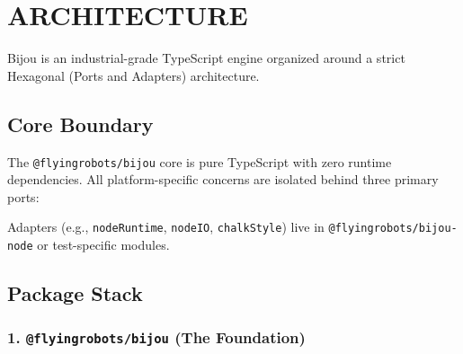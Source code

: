 \chapter{ARCHITECTURE}\label{record-003}

\smallskip

Bijou is an industrial-grade TypeScript engine organized around a strict Hexagonal (Ports and Adapters) architecture.

\section{Core Boundary}\label{record-003-core-boundary}

The \texttt{@\allowbreak{}f\allowbreak{}l\allowbreak{}y\allowbreak{}i\allowbreak{}n\allowbreak{}g\allowbreak{}r\allowbreak{}o\allowbreak{}b\allowbreak{}o\allowbreak{}t\allowbreak{}s\allowbreak{}/\allowbreak{}b\allowbreak{}i\allowbreak{}j\allowbreak{}o\allowbreak{}u} core is pure TypeScript with zero runtime dependencies. All platform-specific concerns are isolated behind three primary ports:



Adapters (e.g., \texttt{n\allowbreak{}o\allowbreak{}d\allowbreak{}e\allowbreak{}R\allowbreak{}u\allowbreak{}n\allowbreak{}t\allowbreak{}i\allowbreak{}m\allowbreak{}e}, \texttt{n\allowbreak{}o\allowbreak{}d\allowbreak{}e\allowbreak{}I\allowbreak{}O}, \texttt{c\allowbreak{}h\allowbreak{}a\allowbreak{}l\allowbreak{}k\allowbreak{}S\allowbreak{}t\allowbreak{}y\allowbreak{}l\allowbreak{}e}) live in \texttt{@\allowbreak{}f\allowbreak{}l\allowbreak{}y\allowbreak{}i\allowbreak{}n\allowbreak{}g\allowbreak{}r\allowbreak{}o\allowbreak{}b\allowbreak{}o\allowbreak{}t\allowbreak{}s\allowbreak{}/\allowbreak{}b\allowbreak{}i\allowbreak{}j\allowbreak{}o\allowbreak{}u\allowbreak{}-\allowbreak{}n\allowbreak{}o\allowbreak{}d\allowbreak{}e} or test-specific modules.

\section{Package Stack}\label{record-003-package-stack}

\subsection{\texorpdfstring{1. \texttt{@\allowbreak{}f\allowbreak{}l\allowbreak{}y\allowbreak{}i\allowbreak{}n\allowbreak{}g\allowbreak{}r\allowbreak{}o\allowbreak{}b\allowbreak{}o\allowbreak{}t\allowbreak{}s\allowbreak{}/\allowbreak{}b\allowbreak{}i\allowbreak{}j\allowbreak{}o\allowbreak{}u} (The Foundation)}{1.  (The Foundation)}}\label{record-003-flyingrobotsbijou-the-foundation}

